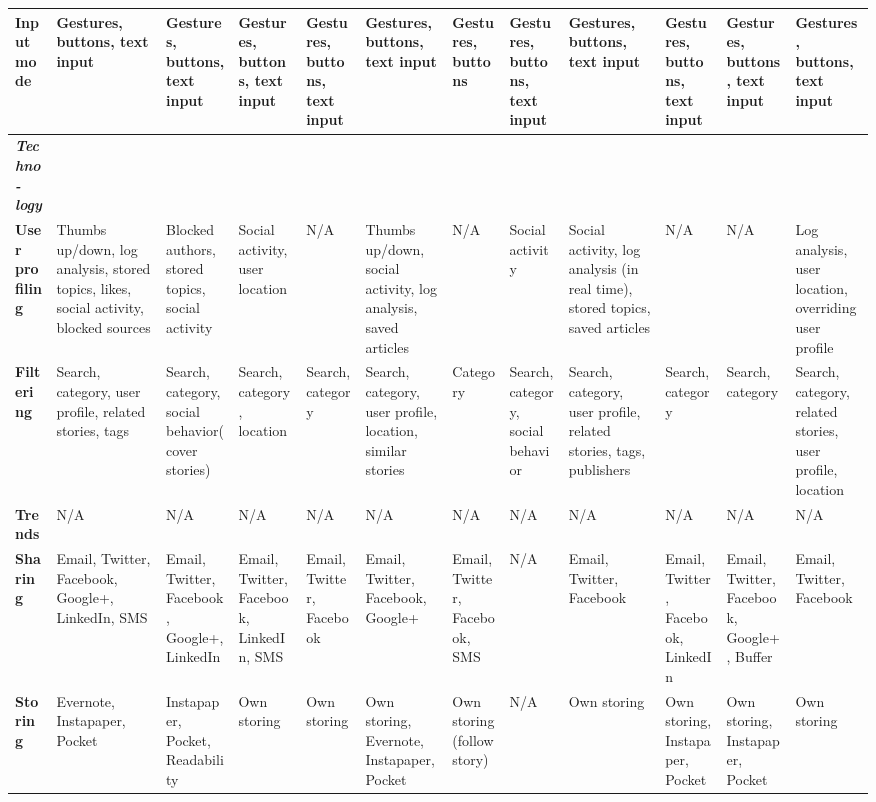 \begin{landscape}
\begin{center}
\begin{longtable}{ | p{1.6cm} | p{1.6cm} | p{1.6cm} | p{1.6cm} | p{1.6cm} | p{1.6cm} | p{1.6cm} | p{1.6cm} | p{1.6cm} | p{1.6cm} | p{1.6cm} | p{1.6cm} |}
\textbf{Input mode} & Gestures, buttons, text input & Gestures, buttons, text input & Gestures, buttons, text input & Gestures, buttons, text input & Gestures, buttons, text input & Gestures, buttons & Gestures, buttons, text input & Gestures, buttons, text input & Gestures, buttons, text input & Gestures, buttons, text input & Gestures, buttons, text input \\ \hline

\textit{\textbf{Techno-logy}} &&&&&&&&&&& \\ \hline

\textbf{User profiling} & Thumbs up/down, log analysis, stored topics, likes, social activity, blocked sources & Blocked authors, stored topics, social activity & Social activity, user location & N/A & Thumbs up/down, social activity, log analysis, saved articles & N/A & Social activity & Social activity, log analysis (in real time), stored topics, saved articles & N/A & N/A & Log analysis, user location, overriding user profile \\ \hline

\textbf{Filtering} & Search, category, user profile, related stories, tags & Search, category, social behavior(cover stories) & Search, category, location & Search, category & Search, category, user profile, location, similar stories & Category & Search, category, social behavior & Search, category, user profile, related stories, tags, publishers & Search, category & Search, category & Search, category, related stories, user profile, location  \\ \hline

\textbf{Trends} & N/A & N/A & N/A & N/A & N/A & N/A & N/A & N/A & N/A & N/A & N/A\\ \hline

\textbf{Sharing} & Email, Twitter, Facebook, Google+, LinkedIn, SMS & Email, Twitter, Facebook, Google+, LinkedIn & Email, Twitter, Facebook, LinkedIn, SMS & Email, Twitter, Facebook & Email, Twitter, Facebook, Google+ & Email, Twitter, Facebook, SMS & N/A & Email, Twitter, Facebook & Email, Twitter, Facebook, LinkedIn & Email, Twitter, Facebook, Google+, Buffer & Email, Twitter, Facebook \\ \hline

\textbf{Storing} & Evernote, Instapaper, Pocket & Instapaper, Pocket, Readability & Own storing & Own storing & Own storing, Evernote, Instapaper, Pocket & Own storing (follow story) & N/A & Own storing & Own storing, Instapaper, Pocket & Own storing, Instapaper, Pocket & Own storing \\ \hline

\end{longtable}
\end{center}
\end{landscape}
